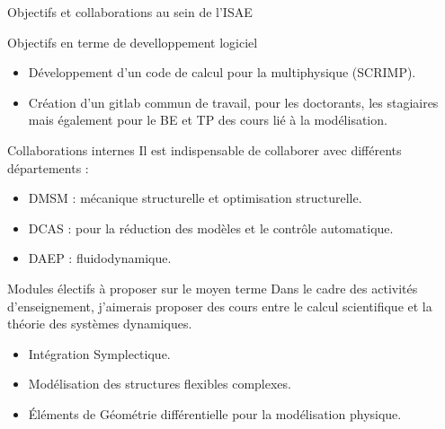 \documentclass[aspectratio=169, french]{ISAE-Beamer}
\begin{document}
\begin{frame}{Objectifs et collaborations au sein de l'ISAE}

\begin{block}{Objectifs en terme de develloppement logiciel}
	\begin{itemize}
		\item Développement d'un code de calcul pour la multiphysique (SCRIMP).
		\item Création d'un gitlab commun de travail, pour les doctorants, les stagiaires mais également pour le BE et TP des cours lié à la modélisation.
	\end{itemize}	
	
\end{block}

	\begin{block}{Collaborations internes}
		Il est indispensable de collaborer avec différents départements :
		\begin{itemize}
			\item DMSM : mécanique structurelle et optimisation structurelle. 
			\item DCAS : pour la réduction des modèles et le contrôle automatique.
			\item DAEP : fluidodynamique.
		\end{itemize}
	\end{block}

\end{frame}


\begin{frame}{Modules électifs à proposer sur le moyen terme}
Dans le cadre des activités d'enseignement, j'aimerais proposer des cours entre le calcul scientifique et la théorie des systèmes dynamiques.
\begin{itemize}
	\item Intégration Symplectique.
	\item Modélisation des structures flexibles complexes.
	\item Éléments de Géométrie différentielle pour la modélisation physique.
\end{itemize}
\end{frame}
	





	
	

\end{document}

